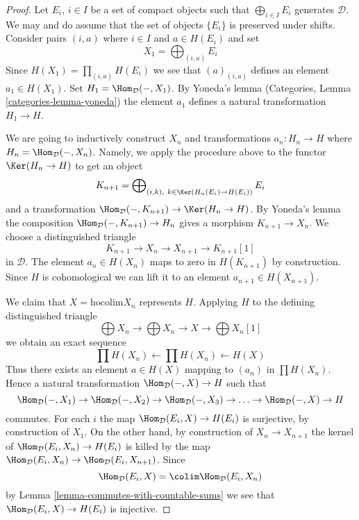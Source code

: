 \begin{proof}
Let $E_i$, $i \in I$ be a set of compact objects such that
$\bigoplus_{i \in I} E_i$ generates $\mathcal{D}$. We may and do assume
that the set of objects $\{E_i\}$ is preserved under shifts. Consider pairs
$(i, a)$ where $i \in I$ and $a \in H(E_i)$ and set
$$
X_1 = \bigoplus\nolimits_{(i, a)} E_i
$$
Since $H(X_1) = \prod_{(i, a)} H(E_i)$ we see that $(a)_{(i, a)}$
defines an element $a_1 \in H(X_1)$. Set $H_1 = \Hom_\mathcal{D}(- , X_1)$.
By Yoneda's lemma (Categories, Lemma \ref{categories-lemma-yoneda})
the element $a_1$ defines a natural transformation $H_1 \to H$.

\medskip\noindent
We are going to inductively construct $X_n$ and transformations
$a_n : H_n \to H$ where $H_n = \Hom_\mathcal{D}(-, X_n)$.
Namely, we apply the procedure
above to the functor $\Ker(H_n \to H)$ to get an object
$$
K_{n + 1} = \bigoplus\nolimits_{(i, k),\ k \in \Ker(H_n(E_i) \to H(E_i))} E_i
$$
and a transformation $\Hom_\mathcal{D}(-, K_{n + 1}) \to \Ker(H_n \to H)$.
By Yoneda's lemma the composition $\Hom_\mathcal{D}(-, K_{n + 1}) \to H_n$
gives a morphism $K_{n + 1} \to X_n$. We choose
a distinguished triangle
$$
K_{n + 1} \to X_n \to X_{n + 1} \to K_{n + 1}[1]
$$
in $\mathcal{D}$. The element $a_n \in H(X_n)$ maps to zero
in $H(K_{n + 1})$ by construction. Since $H$ is cohomological
we can lift it to an element $a_{n + 1} \in H(X_{n + 1})$.

\medskip\noindent
We claim that $X = \text{hocolim} X_n$ represents $H$. Applying $H$
to the defining distinguished triangle
$$
\bigoplus X_n \to
\bigoplus X_n \to X \to
\bigoplus X_n[1]
$$
we obtain an exact sequence
$$
\prod H(X_n) \leftarrow 
\prod H(X_n) \leftarrow 
H(X)
$$
Thus there exists an element $a \in H(X)$ mapping to $(a_n)$
in $\prod H(X_n)$. Hence a natural transformation
$\Hom_\mathcal{D}(- , X) \to H$ such that
$$
\Hom_\mathcal{D}(-, X_1) \to
\Hom_\mathcal{D}(-, X_2) \to
\Hom_\mathcal{D}(-, X_3) \to \ldots \to
\Hom_\mathcal{D}(-, X) \to H
$$
commutes. For each $i$ the map $\Hom_\mathcal{D}(E_i, X) \to H(E_i)$
is surjective, by construction of $X_1$. On the other hand, by construction
of $X_n \to X_{n + 1}$ the kernel of $\Hom_\mathcal{D}(E_i, X_n) \to H(E_i)$
is killed by the map
$\Hom_\mathcal{D}(E_i, X_n) \to \Hom_\mathcal{D}(E_i, X_{n + 1})$.
Since
$$
\Hom_\mathcal{D}(E_i, X) = \colim \Hom_\mathcal{D}(E_i, X_n)
$$
by Lemma \ref{lemma-commutes-with-countable-sums}
we see that $\Hom_\mathcal{D}(E_i, X) \to H(E_i)$ is injective.


\end{proof}

